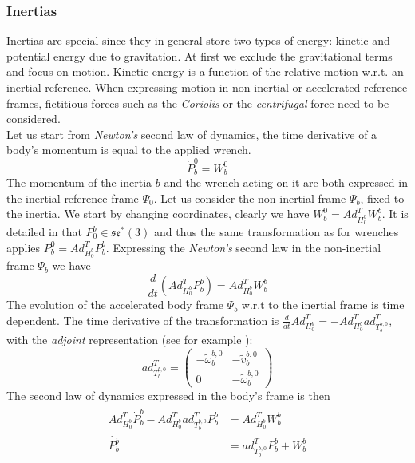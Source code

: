\documentclass[a4paper,twoside, openright,12pt]{report}
\begin{document}
\subsubsection{Inertias}
Inertias are special since they in general store two types of energy: kinetic and potential energy due to gravitation. At first we exclude the gravitational terms and focus on motion. Kinetic energy is a function of the relative motion w.r.t. an inertial reference. When expressing motion in non-inertial or accelerated reference frames, fictitious forces such as the \emph{Coriolis} or the \emph{centrifugal} force need to be considered.\\
Let us start from \emph{Newton's} second law of dynamics, the time derivative of a body's momentum is equal to the applied wrench.
\begin{equation}
\dot{P}_b^0 = W_b^0
\end{equation}
The momentum of the inertia $b$ and the wrench acting on it are both expressed in the inertial reference frame $\Psi_0$. Let us consider the non-inertial frame $\Psi_b$, fixed to the inertia. We start by changing coordinates, clearly we have $W_b^0 = Ad_{H_0^b}^T W_b^b$. It is detailed in \cite{Stramigioli_01} that $P_0^b \in \mathfrak{se}^*(3)$ and thus the same transformation as for wrenches applies $P_b^0 = Ad_{H_0^b}^T P_b^b$. Expressing the \emph{Newton's} second law in the non-inertial frame $\Psi_b$ we have
\begin{equation}
\frac{d}{dt}(Ad_{H_0^b}^T P_b^b) = Ad_{H_0^b}^T W_b^b
\end{equation}
The evolution of the accelerated body frame $\Psi_b$ w.r.t to the inertial frame is time dependent. The time derivative of the transformation is $\frac{d}{dt}Ad_{H_0^b}^T = -Ad_{H_0^b}^T ad_{T_b^{b,0}}^T $, with the \emph{adjoint} representation (see for example \cite{Stramigioli_01b}):
\begin{equation}\label{EQ:adjointmapping}
ad_{T_b^{b,0}}^T = \begin{pmatrix}
-\tilde{\omega}_b^{b,0} & -\tilde{v}_b^{b,0} \\ 0 & -\tilde{\omega}_b^{b,0}\end{pmatrix}
\end{equation}
The second law of dynamics expressed in the body's frame is then
\begin{eqnarray}
\begin{aligned}
Ad_{H_0^b}^T \dot{P}_b^b -Ad_{H_0^b}^T ad_{T_b^{b,0}}^T P_b^b &= Ad_{H_0^b}^T W_b^b \\
\dot{P_b^b} &= ad_{T_b^{b,0}}^T P_b^b + W_b^b
\end{aligned} 
\end{eqnarray}
\end{document}
